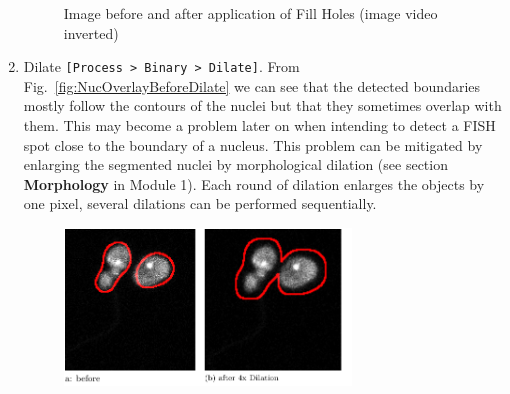 \documentclass[11pt,a4paper,oneside]{report}
\newcommand{\ijmenu}[1]{\texttt{\small#1}}
\begin{document}
\begin{enumerate}
    \begin{figure}[h!tbp]
        \centering
        \quad
         \quad
         \caption{Image before and after application of Fill Holes (image video inverted)}
         \label{fig:NucFillHoles}
    \end{figure}
    
    \item Dilate
    \ijmenu{[Process >  Binary > Dilate]}.
    From Fig.~\ref{fig:NucOverlayBeforeDilate} we can see that the detected boundaries mostly follow the contours of the nuclei but that they sometimes overlap with them. This may become a problem later on when intending to detect a FISH spot close to the boundary of a nucleus. This problem can be mitigated by enlarging the segmented nuclei by morphological dilation (see section \textbf{Morphology} in Module 1). Each round of dilation enlarges the objects by one pixel, several dilations can be performed sequentially. 
    
\begin{figure}[htbp]
\centering
\includegraphics[width=3in]{mod3mergedfig-NucOverlayDilate.pdf}


\end{figure}
\end{enumerate}
\end{document}
